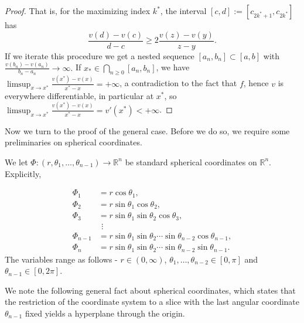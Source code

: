 \documentclass{article}
\begin{document}
\begin{proof}
\noindent That is, for the maximizing index $k^*$, the interval $[c,d]:=[c_{2k^*+1},c_{2k^*}]$ has  $$\frac{v(d)-v(c)}{d-c} \ge2 \frac{v(z)-v(y)}{z-y}.$$ If we iterate this procedure we get a nested sequence $[a_n,b_n]\subset [a,b]$ with $\frac{v(b_n)-v(a_n)}{b_n-a_n}\to\infty.$ If $x_*\in\bigcap_{n\ge0}[a_n,b_n]$, we have $\limsup_{x\to x^*}\frac{v(x^*)-v(x)}{x^*-x}=+\infty$, a contradiction to the fact that $f$, hence $v$ is everywhere differentiable, in particular at $x^*$, so $\limsup_{x\to x^*}\frac{v(x^*)-v(x)}{x^*-x}=v'(x^*) < +\infty$.
\end{proof}

Now we turn to the proof of the general case. Before we do so, we require some preliminaries on spherical coordinates. 

We let $\Phi: (r, \theta_1, \dots, \theta_{n-1}) \to \mathbb R^n$ be standard spherical coordinates on $\mathbb R^n$. Explicitly,

$$\begin{aligned}
\Phi_1 &= r \cos\theta_1, \\[4pt]
\Phi_2 &= r \sin\theta_1 \cos\theta_2, \\[4pt]
\Phi_3 &= r \sin\theta_1 \sin\theta_2 \cos\theta_3, \\[4pt]
&\ \,\vdots \\[4pt]
\Phi_{n-1} &= r \sin\theta_1 \sin\theta_2 \cdots \sin\theta_{n-2}\cos\theta_{n-1}, \\[4pt]
\Phi_n &= r \sin\theta_1 \sin\theta_2 \cdots \sin\theta_{n-2}\sin\theta_{n-1}.
\end{aligned}$$
The variables range as follows - $r \in (0, \infty)$, $\theta_1, \dots, \theta_{n-2} \in [0, \pi]$ and $\theta_{n-1} \in [0, 2\pi]$.

We note the following general fact about spherical coordinates, which states that the restriction of the coordinate system to a slice with the last angular coordinate $\theta_{n-1}$ fixed yields a hyperplane through the origin.
\end{document}
